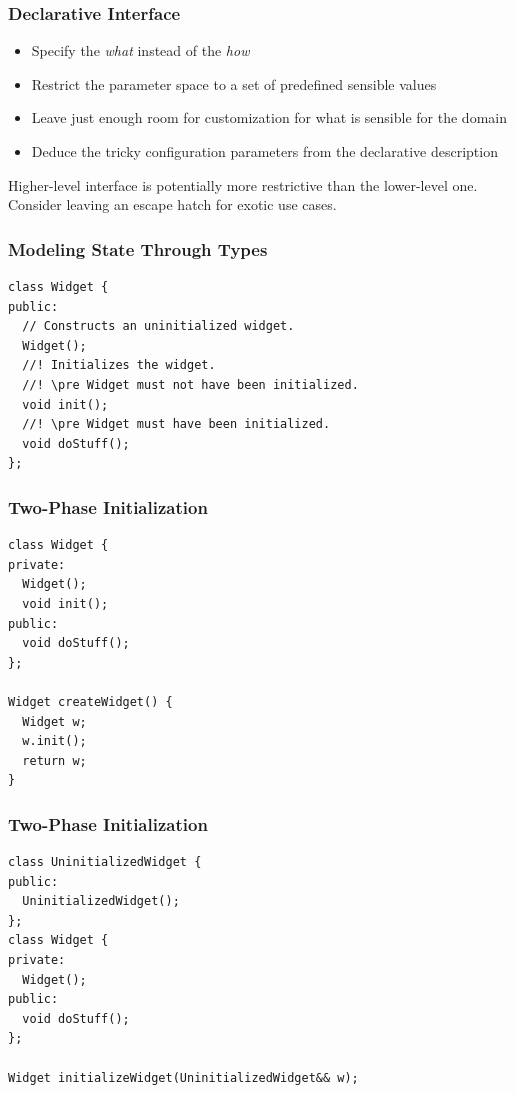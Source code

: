 \documentclass[aspectratio=169]{beamer}
\begin{document}
\begin{frame}
  \frametitle{Declarative Interface}
  
  \begin{itemize}
  \item Specify the \textit{what} instead of the \textit{how}
  \item Restrict the parameter space to a set of predefined sensible values
  \item Leave just enough room for customization for what is sensible for the domain
  \item Deduce the tricky configuration parameters from the declarative description
  \end{itemize}
  
  Higher-level interface is potentially more restrictive than the lower-level one. Consider leaving an escape hatch for exotic use cases.
\end{frame}

\begin{frame}[fragile]
  \frametitle{Modeling State Through Types}
  
  \begin{lstlisting}[style=cpp20]
class Widget {
public:
  // Constructs an uninitialized widget.
  Widget();
  //! Initializes the widget.
  //! \pre Widget must not have been initialized.
  void init();
  //! \pre Widget must have been initialized.
  void doStuff();
};
  \end{lstlisting}
\end{frame}

\begin{frame}[fragile]
  \frametitle{Two-Phase Initialization}

  \begin{lstlisting}[style=cpp20]
class Widget {
private:
  Widget();
  void init();
public:
  void doStuff();
};

Widget createWidget() {
  Widget w;
  w.init();
  return w;
}
  \end{lstlisting}
\end{frame}

\begin{frame}[fragile]
  \frametitle{Two-Phase Initialization}

  \begin{lstlisting}[style=cpp20]
class UninitializedWidget {
public:
  UninitializedWidget();
};
class Widget {
private:
  Widget();
public:
  void doStuff();
};

Widget initializeWidget(UninitializedWidget&& w);
  \end{lstlisting}
\end{frame}
\end{document}
